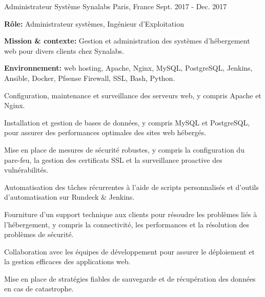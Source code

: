 \begin{cventries}
\cventry
{Administrateur Système} %
{Synalabs} %
{Paris, France} %
{Sept. 2017 - Dec. 2017} %
{
  \begin{cvitems} %
    \item {\textbf{Rôle:} Administrateur systèmes, Ingénieur d'Exploitation}
    \item {\textbf{Mission \& contexte:} Gestion et administration des systèmes d'hébergement web pour divers clients chez Synalabs.}
    \item {\textbf{Environnement:} web hosting, Apache, Nginx, MySQL, PostgreSQL, Jenkins, Ansible, Docker, Pfsense Firewall, SSL, Bash, Python.} 
    \item {Configuration, maintenance et surveillance des serveurs web, y compris Apache et Nginx.}
    \item {Installation et gestion de bases de données, y compris MySQL et PostgreSQL, pour assurer des performances optimales des sites web hébergés.}
    \item {Mise en place de mesures de sécurité robustes, y compris la configuration du pare-feu, la gestion des certificats SSL et la surveillance proactive des vulnérabilités.}
    \item {Automatisation des tâches récurrentes à l'aide de scripts personnalisés et d'outils d'automatisation sur Rundeck \& Jenkins.}
    \item {Fourniture d'un support technique aux clients pour résoudre les problèmes liés à l'hébergement, y compris la connectivité, les performances et la résolution des problèmes de sécurité.}
    \item {Collaboration avec les équipes de développement pour assurer le déploiement et la gestion efficaces des applications web.}
    \item {Mise en place de stratégies fiables de sauvegarde et de récupération des données en cas de catastrophe.}
  \end{cvitems}
}


\end{cventries}
